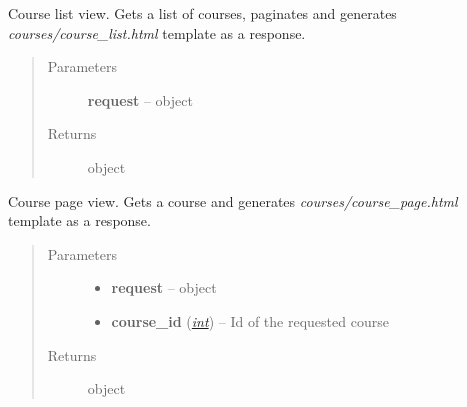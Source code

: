 \documentclass[letterpaper,10pt,english]{sphinxmanual}
\begin{document}
\begin{fulllineitems}
\label{web_portal:core.courses.views.course_list}
Course list view. Gets a list of courses, paginates and generates
\emph{courses/course\_list.html} template as a response.
\begin{quote}\begin{description}
\item[{Parameters}] \leavevmode
\textbf{request} --  object

\item[{Returns}] \leavevmode
{} object

\end{description}\end{quote}

\end{fulllineitems}


\begin{fulllineitems}
\label{web_portal:core.courses.views.course_page}
Course page view. Gets a course and generates \emph{courses/course\_page.html}
template as a response.
\begin{quote}\begin{description}
\item[{Parameters}] \leavevmode\begin{itemize}
\item {} 
\textbf{request} --  object

\item {} 
\textbf{course\_id} (\href{http://docs.python.org/library/functions.html\#int}{\emph{int}}) -- Id of the requested course

\end{itemize}

\item[{Returns}] \leavevmode
{} object

\end{description}\end{quote}

\end{fulllineitems}

\end{document}
